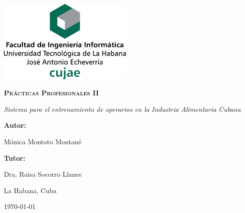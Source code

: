 \begin{titlepage}

\centering

{\includegraphics[width=0.5\textwidth]{imagen/cujae}\par}

\vspace{4cm}

{\bfseries\scshape\huge Prácticas Profesionales II\par}
\vspace{1cm}

{\itshape\Large Sistema para el entrenamiento de operarios en la Industria Alimentaria Cubana \par}
\vspace{4cm}

{\bfseries\Large Autor:} { \Large Mónica Montoto Montané \par}
{\bfseries\Large Tutor: }{\Large Dra. Raisa Socorro Llanes \par}
\vfill

{\Large La Habana, Cuba \par}

\small{\mifecha\today}

\end{titlepage}


